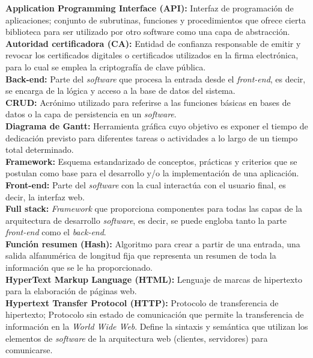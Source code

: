 \documentclass[12pt,a4paper, twoside]{report}
\begin{document}
	\noindent
	\textbf{Application Programming Interface (API):} Interfaz de programación de aplicaciones; conjunto de subrutinas, funciones y procedimientos que ofrece cierta biblioteca para ser utilizado por otro software como una capa de abstracción. \\
	\textbf{Autoridad certificadora (CA):} Entidad de confianza responsable de emitir y revocar los certificados digitales o certificados utilizados en la firma electrónica, para lo cual se emplea la criptografía de clave pública. \\
	\textbf{Back-end:} Parte del \textit{software} que procesa la entrada desde el \textit{front-end}, es decir, se encarga de la lógica y acceso a la base de datos del sistema. \\
	\textbf{CRUD:} Acrónimo utilizado para referirse a las funciones básicas en bases de datos o la capa de persistencia en un \textit{software}. \\
	\textbf{Diagrama de Gantt:} Herramienta gráfica cuyo objetivo es exponer el tiempo de dedicación previsto para diferentes tareas o actividades a lo largo de un tiempo total determinado. \\
	\textbf{Framework:} Esquema estandarizado de conceptos, prácticas y criterios que se postulan como base para el desarrollo y/o la implementación de una aplicación. \\
	\textbf{Front-end:} Parte del \textit{software} con la cual interactúa con el usuario final, es decir, la interfaz web. \\ 
	\textbf{Full stack:} \textit{Framework} que proporciona componentes para todas las capas de la arquitectura de desarrollo \textit{software}, es decir, se puede engloba tanto la parte \textit{front-end} como el \textit{back-end}. \\
	\textbf{Función resumen (Hash):} Algoritmo para crear a partir de una entrada, una salida alfanumérica de longitud fija que representa un resumen de toda la información que se le ha proporcionado. \\
	\textbf{HyperText Markup Language (HTML):} Lenguaje de marcas de hipertexto para la elaboración de páginas web. \\
	\textbf{Hypertext Transfer Protocol (HTTP):} Protocolo de transferencia de hipertexto; Protocolo sin estado de comunicación que permite la transferencia de información en la \textit{World Wide Web}. Define la sintaxis y semántica que utilizan los elementos de \textit{software} de la arquitectura web (clientes, servidores) para comunicarse. \\
\end{document}
